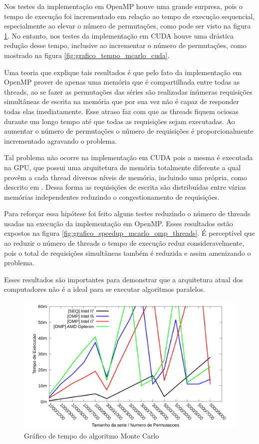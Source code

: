 Nos testes da implementação em OpenMP houve uma grande surpresa, pois o tempo de execução foi incrementado em relação ao tempo de execução sequencial, especialmente ao elevar o número de permutações, como pode ser visto na figura \ref{fig:grafico_tempo_mcarlo_omp}. No entanto, nos testes da implementação em CUDA houve uma drástica redução desse tempo, inclusive ao incrementar o número de permutações, como mostrado na figura \ref{fig:grafico_tempo_mcarlo_cuda}.

Uma teoria que explique tais resultados é que pelo fato da implementação em OpenMP prover de apenas uma memória que é compartilhada entre todas as threads, ao se fazer as permutações das séries são realizadas inúmeras requisições simultâneas de escrita na memória que por sua vez não é capaz de responder todas elas imediatamente. Esse atraso faz com que as threads fiquem ociosas durante um longo tempo até que todas as requisições sejam executadas. Ao aumentar o número de permutações o número de requisições é proporcionalmente incrementado agravando o problema.

Tal problema não ocorre na implementação em CUDA pois a mesma é executada na GPU, que possui uma arquitetura de memória totalmente diferente a qual provêm a cada thread diversos níveis de memória, incluindo uma própria, como descrito em \cite{cuda_guide}. Dessa forma as requisições de escrita são distribuídas entre várias memórias independentes reduzindo o congestionamento de requisições.

Para reforçar essa hipótese foi feito alguns testes reduzindo o número de threads usadas na execução da implementação em OpenMP. Esses resultados estão expostos na figura \ref{fig:grafico_speedup_mcarlo_omp_threads}. É perceptível que ao reduzir o número de threads o tempo de execução reduz consideravelmente, pois o total de requisições simultâneas também é reduzida e assim amenizando o problema.

Esses resultados são importantes para demonstrar que a arquitetura atual dos computadores não é a ideal para se executar algoritmos paralelos.

\begin{figure}[H]
\centering
\includegraphics[width=1.0\textwidth]{Imagens/graficos_mcarlo/mcarlo_tempos_omp.png}
\caption{Gráfico de tempo do algoritmo Monte Carlo}
\label{fig:grafico_tempo_mcarlo_omp}
\end{figure}

